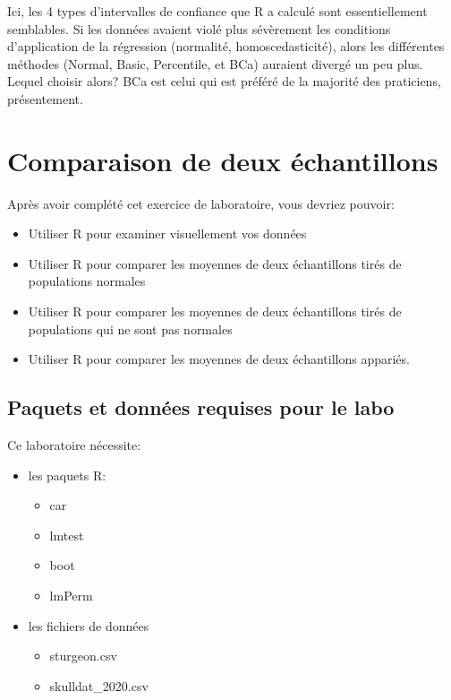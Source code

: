 \documentclass[12pt,]{book}
\providecommand{\tightlist}{%
  \setlength{\itemsep}{0pt}\setlength{\parskip}{0pt}}
\begin{document}
Ici, les 4 types d'intervalles de confiance que R a calculé sont essentiellement semblables. Si les données avaient violé plus sévèrement les conditions d'application de la régression (normalité, homoscedasticité), alors les différentes méthodes (Normal, Basic, Percentile, et BCa) auraient divergé un peu plus. Lequel choisir alors? BCa est celui qui est préféré de la majorité des praticiens, présentement.

\hypertarget{comparaison-de-deux-uxe9chantillons}{%
\chapter{Comparaison de deux échantillons}\label{comparaison-de-deux-uxe9chantillons}}

Après avoir complété cet exercice de laboratoire, vous devriez pouvoir:

\begin{itemize}
\tightlist
\item
  Utiliser R pour examiner visuellement vos données
\item
  Utiliser R pour comparer les moyennes de deux échantillons tirés de populations normales
\item
  Utiliser R pour comparer les moyennes de deux échantillons tirés de populations qui ne sont pas normales
\item
  Utiliser R pour comparer les moyennes de deux échantillons appariés.
\end{itemize}

\hypertarget{set-t}{%
\section{Paquets et données requises pour le labo}\label{set-t}}

Ce laboratoire nécessite:

\begin{itemize}
\tightlist
\item
  les paquets R:

  \begin{itemize}
  \tightlist
  \item
    car
  \item
    lmtest
  \item
    boot
  \item
    lmPerm
  \end{itemize}
\item
  les fichiers de données

  \begin{itemize}
  \tightlist
  \item
    sturgeon.csv
  \item
    skulldat\_2020.csv
  \end{itemize}
\end{itemize}
\end{document}
